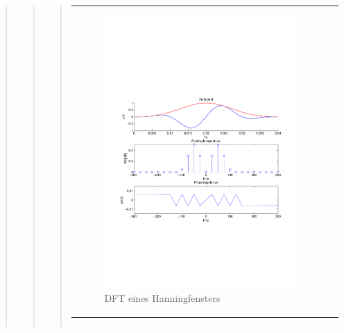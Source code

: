 \begin{quote}
\begin{quote}
\begin{quote}
\begin{center}
\begin{tabular}{ll}
\begin{minipage}{0.6\textwidth}
                        \begin{figure}[H]
                            \label{fig:}
                            \includegraphics[scale=0.5,trim = 1.5cm 7cm 1.5cm 8cm, clip]{./Bilder/BlackManwindow}
                            \caption{DFT eines Hanningfensters}
                        \end{figure}
                    \vspace{-1.5em}
    
                    \end{minipage}
    
                \end{tabular}
                \end{center}
    
                \begin{center}
                \begin{tabular}{ll}
    

\end{tabular}
\end{center}
\end{quote}
\end{quote}
\end{quote}
